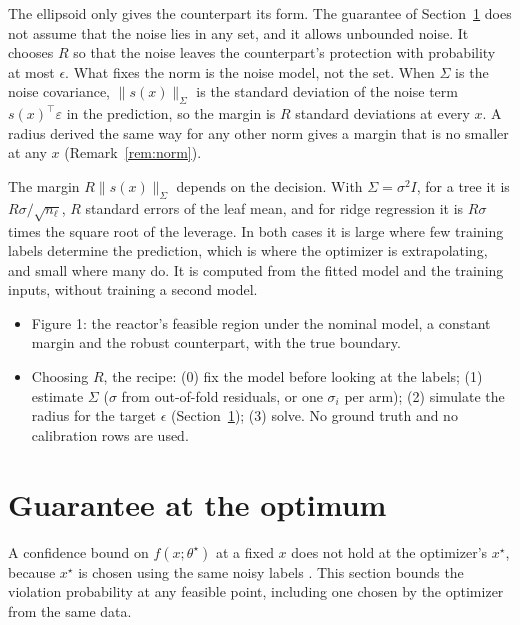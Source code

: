 The ellipsoid only gives the counterpart its form. The guarantee of
Section~\ref{sec:guarantee} does not assume that the noise lies in any set,
and it allows unbounded noise. It chooses $R$ so that the noise leaves the
counterpart's protection with probability at most $\epsilon$. What fixes the
norm is the noise model, not the set. When $\Sigma$ is the noise covariance,
$\|s(x)\|_\Sigma$ is the standard deviation of the noise term
$s(x)^\top\varepsilon$ in the prediction, so the margin is $R$ standard
deviations at every $x$. A radius derived the same way for any other norm
gives a margin that is no smaller at any $x$ (Remark~\ref{rem:norm}).

The margin $R\|s(x)\|_\Sigma$ depends on the decision. With
$\Sigma = \sigma^2 I$, for a tree it is $R\sigma/\sqrt{n_\ell}$, $R$ standard
errors of the leaf mean, and for ridge regression it is $R\sigma$ times the
square root of the leverage. In both cases
it is large where few training labels determine the prediction, which is where
the optimizer is extrapolating, and small where many do. It is computed from
the fitted model and the training inputs, without training a second model.

\begin{outline}
\begin{itemize}
  \item Figure 1: the reactor's feasible region under the nominal model, a
    constant margin and the robust counterpart, with the true boundary.
  \item Choosing $R$, the recipe: (0) fix the model before looking at the
    labels; (1) estimate $\Sigma$ ($\sigma$ from out-of-fold residuals, or
    one $\sigma_i$ per arm); (2) simulate the
    radius for the target $\epsilon$ (Section~\ref{sec:guarantee}); (3) solve.
    No ground truth and no calibration rows are used.
\end{itemize}
\end{outline}

\section{Guarantee at the optimum}\label{sec:guarantee}

A confidence bound on $f(x;\theta^\star)$ at a fixed $x$ does not hold at the
optimizer's $x^\star$, because $x^\star$ is chosen using the same noisy labels
\citep{smith2006optimizer, andrews2024inference}. This section bounds the
violation probability at any feasible point, including one chosen by the
optimizer from the same data.


